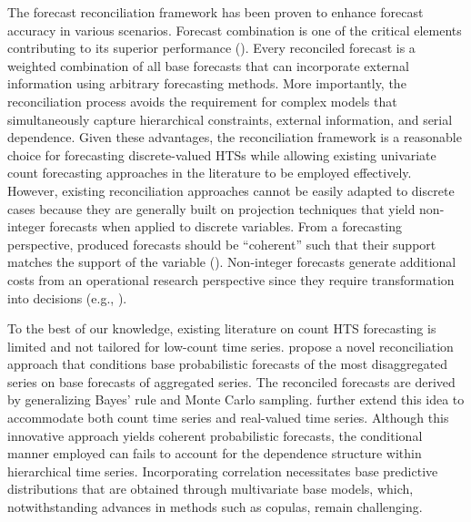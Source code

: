 \documentclass[a4paper,review,12pt,authoryear]{elsarticle}
\theoremstyle{definition}
\begin{document}
The forecast reconciliation framework has been proven to enhance forecast accuracy in various scenarios.
Forecast combination is one of the critical elements contributing to its superior performance (\citealp{hollymanUnderstandingForecastReconciliation2021}).
Every reconciled forecast is a weighted combination of all base forecasts that
can incorporate external information using arbitrary forecasting methods.
More importantly, the reconciliation process avoids the requirement for complex models that simultaneously capture hierarchical constraints, external information, and serial dependence.
Given these advantages, the reconciliation framework is a reasonable choice for forecasting discrete-valued HTSs while allowing existing univariate count forecasting approaches in the literature to be employed effectively.
However, existing reconciliation approaches cannot be easily adapted to discrete cases because they are generally built on projection techniques that yield non-integer forecasts when applied to discrete variables.
From a forecasting perspective, produced forecasts should be ``coherent'' such that their support matches the support of the variable (\citealp{freelandForecastingDiscreteValued2004}).
Non-integer forecasts generate additional costs from an operational research perspective since they require transformation into decisions (e.g., \citealp{goltsosInventoryForecastingMind2022}).

To the best of our knowledge, existing literature on count HTS forecasting is limited and not tailored for low-count time series.
\cite{coraniProbabilisticReconciliationCount2022} propose a novel reconciliation approach that conditions base probabilistic forecasts of the most disaggregated series on base forecasts of aggregated series.
The reconciled forecasts are derived by generalizing Bayes’ rule and Monte Carlo sampling.
\cite{zambonEfficientProbabilisticReconciliation2022} further extend this idea to accommodate both count time series and real-valued time series.
Although this innovative approach yields coherent probabilistic forecasts,
the conditional manner employed can fails to account for the dependence structure within hierarchical time series.
Incorporating correlation necessitates base predictive distributions that are obtained through multivariate base models, which, notwithstanding advances in methods such as copulas, remain challenging.
\end{document}
